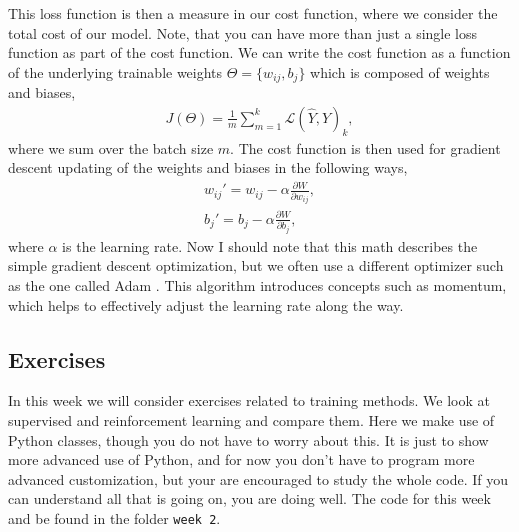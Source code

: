 \documentclass[12pt,a4paper]{article} %
\numberwithin{equation}{section}
\newcommand{\pd}{\partial}
\begin{document}
		This loss function is then a measure in our cost function, where we consider the total cost of our model. Note, that you can have more than just a single loss function as part of the cost function. We can write the cost function as a function of the underlying trainable weights $\Theta = \{w_{ij}, b_j\}$ which is composed of weights and biases,
		\begin{gather}
			J(\Theta) = \frac{1}{m} \sum_{m=1}^{k} \mathcal{L}(\hat{Y}, Y)_k,
		\end{gather}
		where we sum over the batch size $m$. The cost function is then used for gradient descent updating of the weights and biases in the following ways,
		\begin{gather}
			w_{ij}' = w_{ij} - \alpha \frac{\pd W}{\pd w_{ij}},\\
			b_{j}' = b_j - \alpha \frac{\pd W}{\pd b_{j}},
		\end{gather}
		where $\alpha$ is the learning rate. Now I should note that this math describes the simple gradient descent optimization, but we often use a different optimizer such as the one called Adam \cite{kingma:2017}. This algorithm introduces concepts such as momentum, which helps to effectively adjust the learning rate along the way.

	\subsection{Exercises}
		In this week we will consider exercises related to training methods. We look at supervised and reinforcement learning and compare them. Here we make use of Python classes, though you do not have to worry about this. It is just to show more advanced use of Python, and for now you don't have to program more advanced customization, but your are encouraged to study the whole code. If you can understand all that is going on, you are doing well. The code for this week and be found in the folder \texttt{week 2}.\newline
		
\end{document}
